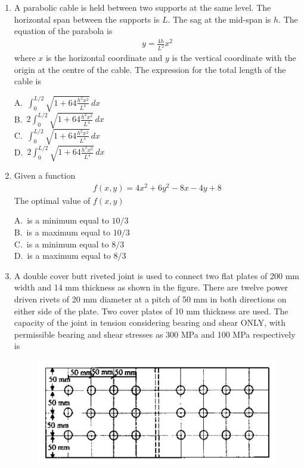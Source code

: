 \documentclass[journal,12pt,onecolumn]{exam}
\theoremstyle{remark}
\begin{document}
\begin{enumerate}
\noindent\item A parabolic cable is held between two supports at the same level. The horizontal span between the supports is $L$. The sag at the mid-span is $h$. The equation of the parabola is 
\begin{align*}
y = \frac{4h}{L^2} x^2
\end{align*}
where $x$ is the horizontal coordinate and $y$ is the vertical coordinate with the origin at the centre of the cable. The expression for the total length of the cable is
\hfill{}

A.\ $\int_0^{L/2} \sqrt{1 + 64 \frac{h^2 x^2}{L^4}} \, dx$ \\
B.\ $2 \int_0^{L/2} \sqrt{1 + 64 \frac{h^2 x^2}{L^4}} \, dx$ \\
C.\ $\int_0^{L/2} \sqrt{1 + 64 \frac{h^2 x^2}{L^4}} \, dx$ \\
D.\ $2 \int_0^{L/2} \sqrt{1 + 64 \frac{h^2 x^2}{L^4}} \, dx$

\noindent\item Given a function 
\begin{align*}
f(x, y) = 4x^2 + 6y^2 - 8x - 4y + 8
\end{align*}
The optimal value of $f(x, y)$
\hfill{}
\begin{multicols}{4}
A.\ is a minimum equal to $10/3$ \\
B.\ is a maximum equal to $10/3$ \\
C.\ is a minimum equal to $8/3$ \\
D.\ is a maximum equal to $8/3$
\end{multicols}

\noindent\item A double cover butt riveted joint is used to connect two flat plates of 200 mm width and 14 mm thickness as shown in the figure. There are twelve power driven rivets of 20 mm diameter at a pitch of 50 mm in both directions on either side of the plate. Two cover plates of 10 mm thickness are used. The capacity of the joint in tension considering bearing and shear ONLY, with permissible bearing and shear stresses as 300 MPa and 100 MPa respectively is
\hfill{}

\begin{figure}[H]
     \centering
     \includegraphics[scale=0.5]{figs/8332fb3c-532c-4d6c-a8c4-1f20c3321f4f.jpg} 
     \caption{}
     \label{fig:figure3}
 \end{figure}


\end{enumerate}
\end{document}
